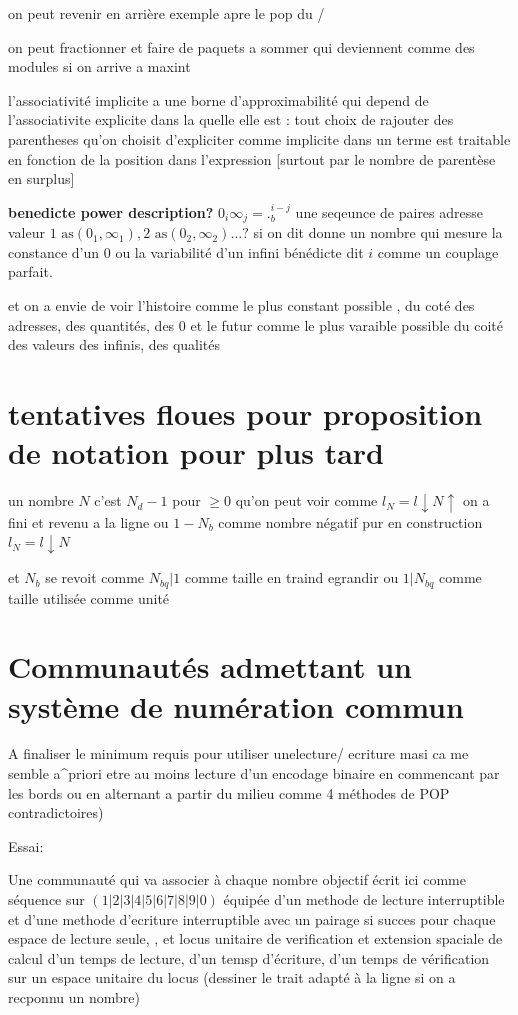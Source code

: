 \documentclass{article}
\begin{document}
on peut revenir en arrière exemple apre le pop du / 

on peut fractionner et faire de paquets a sommer qui deviennent comme des modules 
si on arrive a maxint 

l'associativité   implicite a une borne d'approximabilité qui depend de l'associativite explicite dans la quelle elle est  : tout choix de rajouter des parentheses
qu'on choisit d'expliciter comme implicite dans un terme est traitable en fonction de la position dans l'expression [surtout par le nombre de parentèse  en surplus] 

{\bf benedicte power description?}
$0_i\infty_j=._b^{i-j}$ 
une seqeunce de paires adresse valeur $1 \text{ as} (0_1,\infty_1), 2 \text{ as} (0_2,\infty_2)\ldots ?$  si on dit donne un nombre qui mesure la constance d'un 0 ou la variabilité d'un infini bénédicte dit $i$ comme un couplage parfait.

et on a envie de voir l'histoire comme le plus constant possible , du coté des adresses, des quantités,  des 0
et le futur comme le plus varaible possible du coité des valeurs des infinis, des qualités

\section{tentatives floues pour proposition de notation pour plus tard }
un nombre $N$  c'est $N_d-1$  pour $\ge 0$  qu'on peut voir comme $l_N= l \downarrow N\uparrow$ on a fini et revenu a la ligne
ou $1-N_b$  comme nombre négatif pur en construction  $l_N= l \downarrow N$ 

et  $N_b$ se revoit comme $N_{bq}|1$ comme taille en traind egrandir ou $1|N_{bq}$ comme taille utilisée comme unité 

\section{Communautés admettant un système de numération commun}
A finaliser le minimum requis pour utiliser unelecture/  ecriture masi ca me semble a^priori etre  au moins lecture d'un encodage binaire en commencant par les bords ou en alternant a partir du milieu comme 4 méthodes de POP contradictoires)

Essai:

Une communauté qui va associer à chaque  nombre objectif écrit ici comme séquence sur $(1|2|3|4|5|6|7|8|9|0)$
 équipée d'un methode de lecture interruptible et d'une methode d'ecriture interruptible  avec un pairage si succes
 pour chaque espace de lecture seule,   , et locus unitaire de verification et extension spaciale de calcul 
  d'un temps de lecture, 
  d'un temsp d'écriture,
   d'un temps de vérification sur un espace  unitaire du locus (dessiner le trait adapté à la ligne si on a recponnu un nombre)
   
\end{document}
